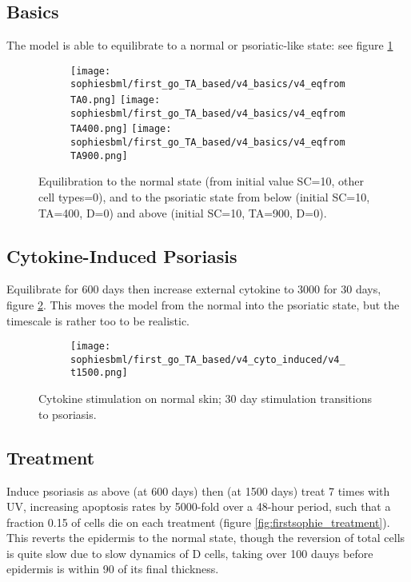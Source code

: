 \documentclass[a4paper,10pt]{report}
\newcommand{\psortbase}{/home/ngrs2/work/bsu/PSORT_Zuliani_Reynolds/}
\newcommand{\sbmlbase}{\psortbase/sbml-sh/}
\newcommand{\sophiesbml}{\sbmlbase/sophie_like}
\begin{document}
\subsection{Basics}

The model is able to equilibrate to a normal or psoriatic-like state: see figure \ref{fig:firstsophie_basics}

\begin{figure}[h!]
  \begin{subfigure}{\textwidth}
    \texttt{[image: \\sophiesbml/first\_go\_TA\_based/v4\_basics/v4\_eqfromTA0.png]}
    \texttt{[image: \\sophiesbml/first\_go\_TA\_based/v4\_basics/v4\_eqfromTA400.png]}
    \texttt{[image: \\sophiesbml/first\_go\_TA\_based/v4\_basics/v4\_eqfromTA900.png]}
  \end{subfigure}
  \caption{Equilibration to the normal state (from initial value SC=10, other cell types=0), and to the psoriatic state from below (initial SC=10, TA=400, D=0) and above (initial SC=10, TA=900, D=0).}
  \label{fig:firstsophie_basics}
\end{figure}

\subsection{Cytokine-Induced Psoriasis}

Equilibrate for 600 days then increase external cytokine to 3000 for 30 days, figure \ref{fig:firstsophie_cytostim}. 
This moves the model from the normal into the psoriatic state, but the timescale is rather too to be realistic. 

\begin{figure}[h!]
  \begin{subfigure}{\textwidth}
    \texttt{[image: \\sophiesbml/first\_go\_TA\_based/v4\_cyto\_induced/v4\_t1500.png]}
  \end{subfigure}
  \caption{Cytokine stimulation on normal skin; 30 day stimulation transitions to psoriasis.}
  \label{fig:firstsophie_cytostim}
\end{figure}


\subsection{Treatment}

Induce psoriasis as above (at 600 days) then (at 1500 days) treat 7 times with UV, increasing apoptosis rates by 5000-fold over a 48-hour period, such that a fraction 0.15 of cells die on each treatment (figure \ref{fig:firstsophie_treatment}). 
This reverts the epidermis  to the normal state, though the reversion of total cells is quite slow due to slow dynamics of D cells, taking over 100 dauys before epidermis is within 90 of its final thickness. 
\end{document}

